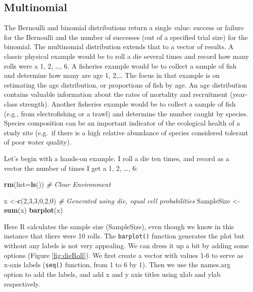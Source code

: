 \documentclass[
]{krantz}
\makeatletter
\newenvironment{Shaded}{\begin{snugshade}}{\end{snugshade}}
\newcommand{\AttributeTok}[1]{\textcolor[rgb]{0.27,0.27,0.27}{#1}}
\newcommand{\CommentTok}[1]{\textcolor[rgb]{0.37,0.37,0.37}{\textit{#1}}}
\newcommand{\DecValTok}[1]{\textcolor[rgb]{0.06,0.06,0.06}{#1}}
\newcommand{\FunctionTok}[1]{\textcolor[rgb]{0.27,0.27,0.27}{\textbf{#1}}}
\newcommand{\NormalTok}[1]{#1}
\newcommand{\OtherTok}[1]{\textcolor[rgb]{0.37,0.37,0.37}{#1}}
\newenvironment{kframe}{%
\medskip{}
\setlength{\fboxsep}{.8em}
 \def\at@end@of@kframe{}%
 \ifinner\ifhmode%
  \def\at@end@of@kframe{\end{minipage}}%
  \begin{minipage}{\columnwidth}%
 \fi\fi%
 \def\FrameCommand##1{\hskip\@totalleftmargin \hskip-\fboxsep
 \colorbox{shadecolor}{##1}\hskip-\fboxsep
     \hskip-\linewidth \hskip-\@totalleftmargin \hskip\columnwidth}%
 \MakeFramed {\advance\hsize-\width
   \@totalleftmargin\z@ \linewidth\hsize
   \@setminipage}}%
 {\par\unskip\endMakeFramed%
 \at@end@of@kframe}
\renewenvironment{Shaded}{\begin{kframe}}{\end{kframe}}
\makeatother
\begin{document}
\hypertarget{Multinomial}{%
\subsection{Multinomial}\label{Multinomial}}

The Bernoulli and binomial distributions return a single value: success or failure for the Bernoulli and the number of successes (out of a specified trial size) for the binomial. The multinomial distribution extends that to a vector of results. A classic physical example would be to roll a die several times and record how many rolls were a 1, 2, \ldots, 6. A fisheries example would be to collect a sample of fish and determine how many are age 1, 2,\ldots{} The focus in that example is on estimating the age distribution, or proportions of fish by age. An age distribution contains valuable information about the rates of mortality and recruitment (year-class strength). Another fisheries example would be to collect a sample of fish (e.g., from electrofishing or a trawl) and determine the number caught by species. Species composition can be an important indicator of the ecological health of a study site (e.g.~if there is a high relative abundance of species considered tolerant of poor water quality).

Let's begin with a hands-on example. I roll a die ten times, and record as a vector the number of times I get a 1, 2, \ldots, 6:

\begin{Shaded}
\begin{Highlighting}[]
\FunctionTok{rm}\NormalTok{(}\AttributeTok{list=}\FunctionTok{ls}\NormalTok{()) }\CommentTok{\# Clear Environment}

\NormalTok{x }\OtherTok{\textless{}{-}}\FunctionTok{c}\NormalTok{(}\DecValTok{2}\NormalTok{,}\DecValTok{3}\NormalTok{,}\DecValTok{3}\NormalTok{,}\DecValTok{0}\NormalTok{,}\DecValTok{2}\NormalTok{,}\DecValTok{0}\NormalTok{)  }\CommentTok{\# Generated using die, equal cell probabilities}
\NormalTok{SampleSize }\OtherTok{\textless{}{-}} \FunctionTok{sum}\NormalTok{(x)}
\FunctionTok{barplot}\NormalTok{(x)}
\end{Highlighting}
\end{Shaded}

Here R calculates the sample size (SampleSize), even though we know in this instance that there were 10 rolls. The \texttt{barplot()} function generates the plot but without any labels is not very appealing. We can dress it up a bit by adding some options (Figure \ref{fig:dieRoll}). We first create a vector with values 1-6 to serve as x-axis labels (\texttt{seq()} function, from 1 to 6 by 1). Then we use the names.arg option to add the labels, and add x and y axis titles using xlab and ylab respectively.
\end{document}
